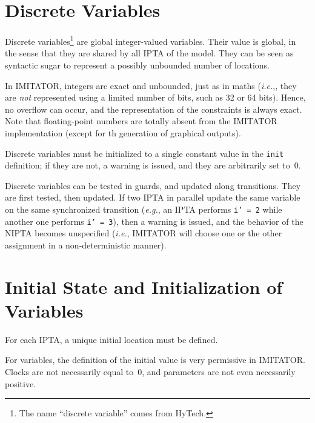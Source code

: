\documentclass[a4paper,11pt]{report}
\makeatletter
\newcommand{\hytech}{{\sc HyTech}}
\newcommand{\imitator}{\textsf{IMITATOR}}
\newcommand{\IPTA}{IPTA}
\newcommand{\NIPTA}{NIPTA}
\newcommand{\styleIMI}[1]{\textcolor{imicolor}{\texttt{#1}}}
\newcommand{\eg}{\textcolor{colorok}{\textit{e.g.},\@}}
\newcommand{\ie}{\textcolor{colorok}{\textit{i.e.},\@}}
\makeatother
\begin{document}
\section{Discrete Variables}\label{section:discrete}

Discrete variables\footnote{%
	The name ``discrete variable'' comes from \hytech{}.
}
are global integer-valued variables.
Their value is global, in the sense that they are shared by all \IPTA{} of the model.
They can be seen as syntactic sugar to represent a possibly unbounded number of locations.

In \imitator{}, integers are exact and unbounded, just as in maths (\ie{}, they are \emph{not} represented using a limited number of bits, such as 32 or 64 bits).
Hence, no overflow can occur, and the representation of the constraints is always exact.
Note that floating-point numbers are totally absent from the \imitator{} implementation (except for th generation of graphical outputs).

Discrete variables must be initialized to a single constant value in the \styleIMI{init} definition;
if they are not, a warning is issued, and they are arbitrarily set to~0.

Discrete variables can be tested in guards, and updated along transitions.
They are first tested, then updated.
If two \IPTA{} in parallel update the same variable on the same synchronized transition (\eg{} an \IPTA{} performs \styleIMI{i' = 2} while another one performs \styleIMI{i' = 3}), then a warning is issued, and the behavior of the \NIPTA{} becomes unspecified (\ie{} \imitator{} will choose one or the other assignment in a non-deterministic manner).



\section{Initial State and Initialization of Variables}\label{section:init}

For each \IPTA{}, a unique initial location must be defined.

For variables, the definition of the initial value is very permissive in \imitator{}.
Clocks are not necessarily equal to~0, and parameters are not even necessarily positive.
\end{document}
